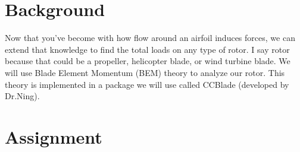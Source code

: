 \documentclass[12pt]{article}
\begin{document}
	
	\section{Background}
	
	Now that you've become with how flow around an airfoil induces forces, we can extend that knowledge to find the total loads on any type of rotor. I say rotor because that could be a propeller, helicopter blade, or wind turbine blade. We will use Blade Element Momentum (BEM) theory to analyze our rotor.  This theory is implemented in a package we will use called CCBlade (developed by Dr.Ning). 
	
	
	\section{Assignment}
\end{document}
